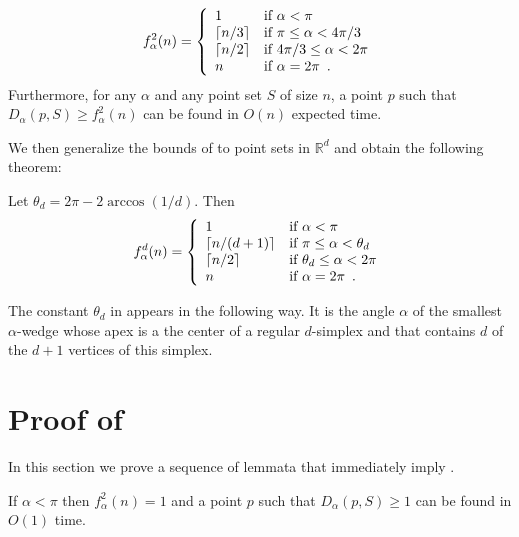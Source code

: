 \documentclass[lotsofwhite]{patmorin}
\newcommand{\blah}[1]{2\arccos(1/#1)}
\begin{document}
\begin{thm}
\[
   f^2_\alpha(n) = \left\{\begin{array}{ll}
                        1 & \mbox{if $\alpha < \pi$} \\
                        \left\lceil n/3 \right\rceil & \mbox{if $\pi\le \alpha < 4\pi/3$} \\
                        \left\lceil n/2 \right\rceil & \mbox{if $4\pi/3\le \alpha < 2\pi$} \\
                        n & \mbox{if $\alpha = 2\pi$\enspace .} 
                       \end{array}\right.
\]
Furthermore, for any $\alpha$ and any point set $S$ of size $n$, a
point $p$ such that $D_\alpha(p,S) \ge
f^2_\alpha(n)$ can be found in $O(n)$ expected time.
\end{thm}

We then generalize the bounds of  to point sets in
$\mathbb{R}^d$ and obtain the following theorem:

\begin{thm}
Let $\theta_d = 2\pi - \blah{d}$.  Then
\[
   f^d_\alpha(n) = \left\{\begin{array}{ll}
                        1 & \mbox{if $\alpha < \pi$} \\
                        \left\lceil n/(d+1) \right\rceil & \mbox{if $\pi\le \alpha < \theta_d$} \\
                        \left\lceil n/2 \right\rceil & \mbox{if $\theta_d\le \alpha < 2\pi$} \\
                        n & \mbox{if $\alpha = 2\pi$\enspace .} 
                       \end{array}\right.
\]
\end{thm} 
The constant $\theta_d$ in  appears in the following
way.  It is the angle $\alpha$ of the smallest $\alpha$-wedge whose
apex is a the center of a regular $d$-simplex and that contains $d$ of
the $d+1$ vertices of this simplex.

\section{Proof of }

In this section we prove a sequence of lemmata that immediately imply
.

\begin{lem}
If $\alpha < \pi$ then $f^2_\alpha(n) = 1$ and a point $p$ such that
$D_\alpha(p,S)\ge 1$ can be found in $O(1)$ time.
\end{lem}
\end{document}
